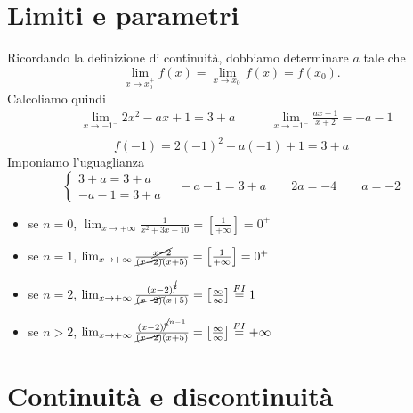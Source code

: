 \section{Limiti e parametri}
\begin{ex}
    [
        Trovare per quale valore di $a$ la funzione 
        \[f(x)=\begin{cases}
            2x^2-ax+1 &  x\leq -1\\
            \frac{ax-1}{x+2} &  x>1
        \end{cases}\]
        è continua in $x_0=-1$.
    ]
    Ricordando la definizione di continuità, dobbiamo determinare $a$ tale che
    \[\lim_{x\to x_0^+}f(x)=\lim_{x\to x_0^-}f(x)=f(x_0).\]
    Calcoliamo quindi 
    \[\begin{aligned}
        &\lim_{x\to-1^-}2x^2-ax+1= 3+a\qquad
        &\lim_{x\to-1^-}\frac{ax-1}{x+2}= -a-1\\
    \end{aligned}\]
    \[f(-1)= 2(-1)^2-a(-1)+1= 3+a\]
    Imponiamo l'uguaglianza
    \[\begin{cases}
        3+a=3+a\\
        -a-1=3+a
    \end{cases}\quad-a-1=3+a\qquad 2a=-4\qquad \boxed{a=-2}\]
\end{ex}
\begin{ex}
    \begin{itemize}
        \item se $n=0$, \quad $\lim_{x\to +\infty}\frac{1}{x^2+3x-10}= \left[ \frac{1}{+\infty}\right]=0^+$
        \item se $n=1$, \quad $\lim_{x\to +\infty}\frac{\cancel{x-2}}{\cancel{(x-2)}(x+5)}= \left[ \frac{1}{+\infty}\right]=0^+$
        \item se $n=2$, \quad $\lim_{x\to +\infty}\frac{(x-2)^{\cancel{2}}}{\cancel{(x-2)}(x+5)}= \left[ \frac{\infty}{\infty}\right]\overset{FI}{=}1$
        \item se $n>2$, \quad $\lim_{x\to +\infty}\frac{(x-2)^{\cancel{n}^{n-1}}}{\cancel{(x-2)}(x+5)}= \left[ \frac{\infty}{\infty}\right]\overset{FI}{=}+\infty$
    \end{itemize}
\end{ex}
\section{Continuità e discontinuità}

